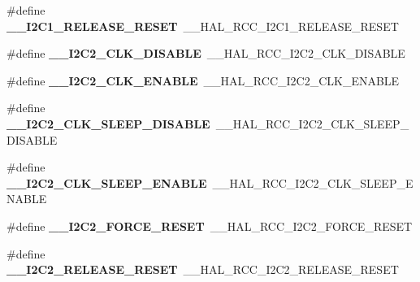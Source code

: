 \begin{DoxyCompactItemize}
\item 
\#define {\bfseries \+\_\+\+\_\+\+I2\+C1\+\_\+\+R\+E\+L\+E\+A\+S\+E\+\_\+\+R\+E\+S\+ET}~\+\_\+\+\_\+\+H\+A\+L\+\_\+\+R\+C\+C\+\_\+\+I2\+C1\+\_\+\+R\+E\+L\+E\+A\+S\+E\+\_\+\+R\+E\+S\+ET\hypertarget{group___h_a_l___r_c_c___aliased_gae58af756d3706dcb17376b4674e70ed8}{}\label{group___h_a_l___r_c_c___aliased_gae58af756d3706dcb17376b4674e70ed8}

\item 
\#define {\bfseries \+\_\+\+\_\+\+I2\+C2\+\_\+\+C\+L\+K\+\_\+\+D\+I\+S\+A\+B\+LE}~\+\_\+\+\_\+\+H\+A\+L\+\_\+\+R\+C\+C\+\_\+\+I2\+C2\+\_\+\+C\+L\+K\+\_\+\+D\+I\+S\+A\+B\+LE\hypertarget{group___h_a_l___r_c_c___aliased_ga4035dd0ee6f7b6386fd8531181786c97}{}\label{group___h_a_l___r_c_c___aliased_ga4035dd0ee6f7b6386fd8531181786c97}

\item 
\#define {\bfseries \+\_\+\+\_\+\+I2\+C2\+\_\+\+C\+L\+K\+\_\+\+E\+N\+A\+B\+LE}~\+\_\+\+\_\+\+H\+A\+L\+\_\+\+R\+C\+C\+\_\+\+I2\+C2\+\_\+\+C\+L\+K\+\_\+\+E\+N\+A\+B\+LE\hypertarget{group___h_a_l___r_c_c___aliased_ga5cef079b7e35da960f9871a7d1ed1816}{}\label{group___h_a_l___r_c_c___aliased_ga5cef079b7e35da960f9871a7d1ed1816}

\item 
\#define {\bfseries \+\_\+\+\_\+\+I2\+C2\+\_\+\+C\+L\+K\+\_\+\+S\+L\+E\+E\+P\+\_\+\+D\+I\+S\+A\+B\+LE}~\+\_\+\+\_\+\+H\+A\+L\+\_\+\+R\+C\+C\+\_\+\+I2\+C2\+\_\+\+C\+L\+K\+\_\+\+S\+L\+E\+E\+P\+\_\+\+D\+I\+S\+A\+B\+LE\hypertarget{group___h_a_l___r_c_c___aliased_ga9433bf9082b7128475bf4a4073bcdca1}{}\label{group___h_a_l___r_c_c___aliased_ga9433bf9082b7128475bf4a4073bcdca1}

\item 
\#define {\bfseries \+\_\+\+\_\+\+I2\+C2\+\_\+\+C\+L\+K\+\_\+\+S\+L\+E\+E\+P\+\_\+\+E\+N\+A\+B\+LE}~\+\_\+\+\_\+\+H\+A\+L\+\_\+\+R\+C\+C\+\_\+\+I2\+C2\+\_\+\+C\+L\+K\+\_\+\+S\+L\+E\+E\+P\+\_\+\+E\+N\+A\+B\+LE\hypertarget{group___h_a_l___r_c_c___aliased_ga64ad1beac30d497e381d374778b1a953}{}\label{group___h_a_l___r_c_c___aliased_ga64ad1beac30d497e381d374778b1a953}

\item 
\#define {\bfseries \+\_\+\+\_\+\+I2\+C2\+\_\+\+F\+O\+R\+C\+E\+\_\+\+R\+E\+S\+ET}~\+\_\+\+\_\+\+H\+A\+L\+\_\+\+R\+C\+C\+\_\+\+I2\+C2\+\_\+\+F\+O\+R\+C\+E\+\_\+\+R\+E\+S\+ET\hypertarget{group___h_a_l___r_c_c___aliased_ga07143f105327507321078f673940461d}{}\label{group___h_a_l___r_c_c___aliased_ga07143f105327507321078f673940461d}

\item 
\#define {\bfseries \+\_\+\+\_\+\+I2\+C2\+\_\+\+R\+E\+L\+E\+A\+S\+E\+\_\+\+R\+E\+S\+ET}~\+\_\+\+\_\+\+H\+A\+L\+\_\+\+R\+C\+C\+\_\+\+I2\+C2\+\_\+\+R\+E\+L\+E\+A\+S\+E\+\_\+\+R\+E\+S\+ET\hypertarget{group___h_a_l___r_c_c___aliased_gaf7a482f23ba23252ef88c00e86edde9a}{}\label{group___h_a_l___r_c_c___aliased_gaf7a482f23ba23252ef88c00e86edde9a}


\end{DoxyCompactItemize}

